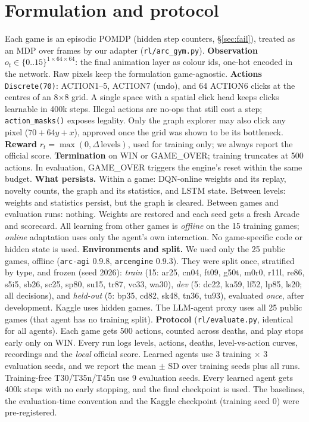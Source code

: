 \documentclass[10pt]{article}
\newcommand{\Tn}[1]{T#1\xspace}
\begin{document}
\section{Formulation and protocol}
\label{sec:mdp}
Each game is an episodic POMDP (hidden step counters, \S\ref{sec:fail}), treated as an MDP over frames by our adapter (\texttt{rl/arc\_gym.py}).
\textbf{Observation} $o_t\in\{0..15\}^{1\times64\times64}$: the final animation layer as colour ids, one-hot encoded in the network. Raw pixels keep the formulation game-agnostic.
\textbf{Actions} \texttt{Discrete(70)}: ACTION1--5, ACTION7 (undo), and 64 ACTION6 clicks at the centres of an 8$\times$8 grid. A single space with a spatial click head keeps clicks learnable in 400k steps. Illegal actions are no-ops that still cost a step; \texttt{action\_masks()} exposes legality. Only the graph explorer may also click any pixel ($70{+}64y{+}x$), approved once the grid was shown to be its bottleneck.
\textbf{Reward} $r_t=\max(0,\Delta\,\text{levels})$, used for training only; we always report the official score. \textbf{Termination} on WIN or GAME\_OVER; training truncates at 500 actions. In evaluation, GAME\_OVER triggers the engine's reset within the same budget.
\textbf{What persists.} Within a game: DQN-online weights and its replay, novelty counts, the graph and its statistics, and LSTM state. Between levels: weights and statistics persist, but the graph is cleared. Between games and evaluation runs: nothing. Weights are restored and each seed gets a fresh Arcade and scorecard. All learning from other games is \emph{offline} on the 15 training games; \emph{online} adaptation uses only the agent's own interaction. No game-specific code or hidden state is used.
\textbf{Environments and split.} We used only the 25 public games, offline (\texttt{arc-agi} 0.9.8, \texttt{arcengine} 0.9.3). They were split once, stratified by type, and frozen (seed 2026): \emph{train} (15: ar25, cn04, ft09, g50t, m0r0, r11l, re86, s5i5, sb26, sc25, sp80, su15, tr87, vc33, wa30), \emph{dev} (5: dc22, ka59, lf52, lp85, ls20; all decisions), and \emph{held-out} (5: bp35, cd82, sk48, tn36, tu93), evaluated \emph{once}, after development. Kaggle uses hidden games. The LLM-agent proxy uses all 25 public games (that agent has no training split).
\textbf{Protocol} (\texttt{rl/evaluate.py}, identical for all agents). Each game gets 500 actions, counted across deaths, and play stops early only on WIN. Every run logs levels, actions, deaths, level-vs-action curves, recordings and the \emph{local} official score. Learned agents use 3 training $\times$ 3 evaluation seeds, and we report the mean $\pm$ SD over training seeds plus all runs. Training-free \Tn{30}/\Tn{35n}/\Tn{45n} use 9 evaluation seeds. Every learned agent gets 400k steps with no early stopping, and the final checkpoint is used. The baselines, the evaluation-time convention and the Kaggle checkpoint (training seed 0) were pre-registered.
\end{document}
